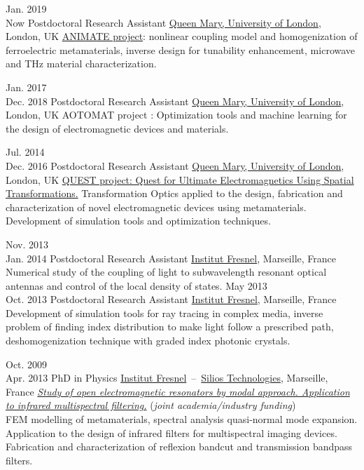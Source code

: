 \documentclass{cv}
\begin{document}
\begin{entrylist}



	\entry
	{Jan. 2019 \\Now}
	{Postdoctoral Research Assistant}
	{\href{http://antennas.eecs.qmul.ac.uk/}{Queen Mary, University of London}, London, UK}
	{\href{https://animate-research.com/}{ANIMATE project}: nonlinear coupling model and homogenization of ferroelectric
		metamaterials, inverse design for tunability enhancement, microwave and THz material characterization.
	}


	\entry
	{Jan. 2017 \\Dec. 2018}
	{Postdoctoral Research Assistant}
	{\href{http://antennas.eecs.qmul.ac.uk/}{Queen Mary, University of London}, London, UK}
	{AOTOMAT project : Optimization tools and machine learning for the design of electromagnetic
		devices and materials.
	}

	\entry
	{Jul. 2014 \\Dec. 2016}
	{Postdoctoral Research Assistant}
	{\href{http://antennas.eecs.qmul.ac.uk/}{Queen Mary, University of London}, London, UK}
	{\href{http://www.quest-spatial-transformation.org/}{QUEST project: Quest for Ultimate Electromagnetics Using Spatial Transformations.}
		Transformation Optics applied to the design, fabrication and characterization of novel electromagnetic devices using metamaterials.
		Development of simulation tools and optimization techniques.
	}


	\entry
	{Nov. 2013\\ Jan. 2014}
	{Postdoctoral Research Assistant}
	{\href{http://www.fresnel.fr/}{Institut Fresnel}, Marseille, France}
	{
		Numerical study of the coupling of light
		to subwavelength resonant optical antennas and control of the local density of states.
	}
	\entry
	{May 2013 \\Oct. 2013}
	{Postdoctoral Research Assistant}
	{\href{http://www.fresnel.fr/}{Institut Fresnel}, Marseille, France}
	{
		Development of simulation tools for ray tracing in complex media, inverse problem of
		finding index distribution to make light follow a prescribed path, deshomogenization
		technique with graded index photonic crystals.
	}

	\entry
	{Oct. 2009\\Apr. 2013}
	{PhD in Physics}
	{\href{http://www.fresnel.fr/}{Institut Fresnel}~--~\href{http://www.silios.com/}{Silios Technologies}, Marseille, France}
	{\emph{\href{http://tel.archives-ouvertes.fr/index.php?halsid=slas337fv1oqlj1okgkq7q42i5&view_this_doc=tel-00918651&version=1}
			{Study of open electromagnetic resonators by modal approach.
				Application to infrared multispectral filtering.}} (\emph{joint academia/industry funding})\\
		FEM modelling of metamaterials, spectral analysis quasi-normal mode expansion.
		Application to the design of infrared filters for multispectral imaging devices.
		Fabrication and characterization of reflexion bandcut and transmission bandpass filters.
	}

\end{entrylist}
\end{document}
